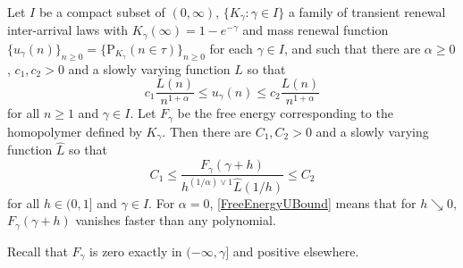 \documentclass[AHL,Unicode,longabstracts]{cedram}
\newcommand{\ga}{\alpha}
\newcommand{\gga}{\gamma}
\newcommand\bP{\ensuremath{\mathrm{P}}}
\begin{document}
\begin{lemm}\label{FreeEnergyU}
Let $I$ be a compact subset of $(0,\infty)$, $\{K_\gga \colon \gga \in I\}$ a family of transient renewal inter-arrival laws with $K_\gga(\infty) = 1 - e^{- \gga}$ and mass renewal function $\{u_\gga(n)\}_{n\ge 0} = \{\bP_{K_\gga}(n\in\tau)\}_{n\ge 0}$ for each $\gga \in I$, and such that there are $\ga \geq 0$, $c_1,c_2 > 0$ and a slowly varying function $L$ so that
\begin{equation}\label{ReturnTimeUBound}
c_1 \frac{L(n)}{n^{1 + \ga}} \leq u_\gga(n) \leq c_2 \frac{L(n)}{n^{1 + \ga}}
\end{equation}
for all $n \geq 1$ and $\gga \in I$. Let $F_\gga$ be the free energy corresponding to the homopolymer defined by $K_\gga$. Then there are $C_1,C_2 > 0$ and a slowly varying function $\hat L$ so that
\begin{equation}\label{FreeEnergyUBound}
C_1 \leq \frac{F_\gga(\gga + h)}{h^{(1/\ga) \vee 1} \hat L(1/h)} \leq C_2
\end{equation}
for all $h \in (0,1]$ and $\gga \in I$. For $\ga = 0$, \eqref{FreeEnergyUBound} means that for $h \searrow 0$, $F_\gga(\gga + h)$ vanishes faster than any polynomial.
\end{lemm}

Recall that $F_\gga$ is zero exactly in $(- \infty,\gga]$ and positive elsewhere.
\end{document}
